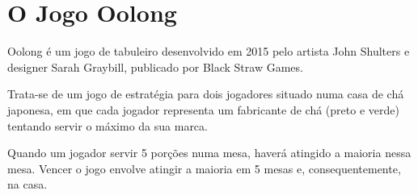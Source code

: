 \documentclass[a4paper]{article}
\begin{document}

\newpage

%
%
%
%
%
%
%


\section{O Jogo Oolong}

Oolong é um jogo de tabuleiro desenvolvido em 2015 pelo artista John Shulters e designer Sarah Graybill, publicado por Black Straw Games. \newline


Trata-se de um jogo de estratégia para dois jogadores situado numa casa de chá japonesa, em que cada jogador representa um fabricante de chá (preto e verde) tentando servir o máximo da sua marca. 

Quando um jogador servir 5 porções numa mesa, haverá atingido a maioria nessa mesa. Vencer o jogo envolve atingir a maioria em 5 mesas e, consequentemente, na casa. \newline
\end{document}
